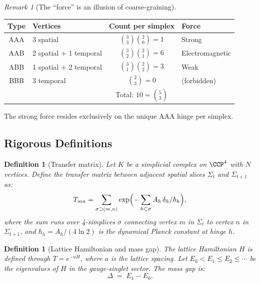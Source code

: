 \documentclass[12pt]{article}
\newtheorem{definition}[theorem]{Definition}
\theoremstyle{remark}
\newtheorem{remark}[theorem]{Remark}
\theoremstyle{definition}
\begin{document}
\begin{remark}[The ``force'' is an illusion of coarse-graining]
\begin{center}
\begin{tabular}{clcl}
\hline
Type & Vertices & Count per simplex & Force \\
\hline
AAA & 3 spatial & $\binom{3}{3}\binom{2}{0} = 1$ & Strong \\
AAB & 2 spatial $+$ 1 temporal & $\binom{3}{2}\binom{2}{1} = 6$ &
  Electromagnetic \\
ABB & 1 spatial $+$ 2 temporal & $\binom{3}{1}\binom{2}{2} = 3$ &
  Weak \\
BBB & 3 temporal & $\binom{2}{3} = 0$ & (forbidden) \\
\hline
& & Total: $10 = \binom{5}{3}$ & \\
\hline
\end{tabular}
\end{center}

\noindent
The strong force resides exclusively on the unique AAA hinge per simplex.

\subsection{Rigorous Definitions}
\label{sec:definitions}

\begin{definition}[Transfer matrix]
\label{def:transfer}
Let $K$ be a simplicial complex on $\CCP^4$ with $N$ vertices.
Define the \emph{transfer matrix} between adjacent spatial slices
$\Sigma_t$ and $\Sigma_{t+1}$ as:
\begin{equation}
T_{mn} = \sum_{\sigma \supset (m,n)}
  \exp\Bigl(-\sum_{h \subset \sigma} A_h\,\delta_h / \hbar_h\Bigr),
\end{equation}
where the sum runs over 4-simplices $\sigma$ connecting vertex $m$
in $\Sigma_t$ to vertex $n$ in $\Sigma_{t+1}$, and
$\hbar_h = A_h/(4\ln 2)$ is the dynamical Planck constant at hinge $h$.
\end{definition}

\begin{definition}[Lattice Hamiltonian and mass gap]
\label{def:massgap}
The lattice Hamiltonian $H$ is defined through $T = e^{-aH}$, where
$a$ is the lattice spacing.  Let $E_0 < E_1 \leq E_2 \leq \cdots$ be
the eigenvalues of $H$ in the gauge-singlet sector.  The
\emph{mass gap} is:
\begin{equation}
\Delta \;=\; E_1 - E_0.
\end{equation}
\end{definition}


\end{remark}
\end{document}
